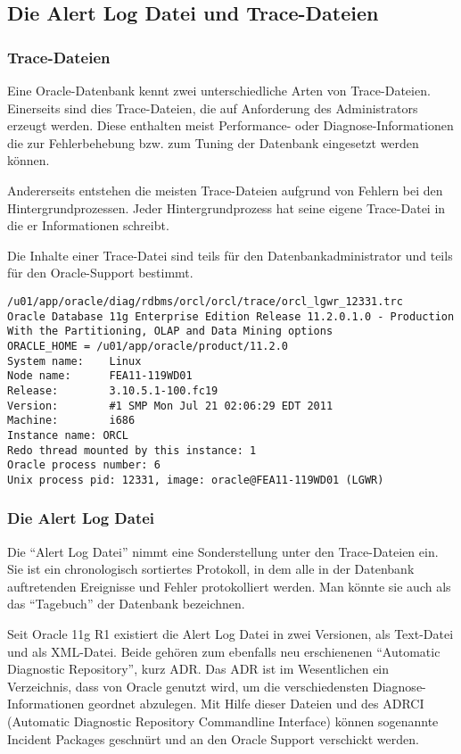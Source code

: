         \subsection{Die Alert Log Datei und Trace-Dateien}
          \subsubsection{Trace-Dateien}
            Eine Oracle-Datenbank kennt zwei unterschiedliche Arten von Trace-Dateien. Einerseits sind dies Trace-Dateien, die auf Anforderung des Administrators erzeugt werden. Diese enthalten meist Performance- oder Diagnose-Informationen die zur Fehlerbehebung bzw. zum Tuning der Datenbank eingesetzt werden k\"onnen.

            Andererseits entstehen die meisten Trace-Dateien aufgrund von Fehlern bei den Hintergrundprozessen. Jeder Hintergrundprozess hat seine eigene Trace-Datei in die er Informationen schreibt.

						Die Inhalte einer Trace-Datei sind teils f\"ur den Datenbankadministrator und teils f\"ur den Oracle-Support bestimmt.
\clearpage
            \begin{lstlisting}[caption={Eine Tracedatei des Log Writers},
            label=orcl_lgwr_12331,emph={[9]ORACLE_HOME},emphstyle={[9]\color{black}},language=terminal]
/u01/app/oracle/diag/rdbms/orcl/orcl/trace/orcl_lgwr_12331.trc 
Oracle Database 11g Enterprise Edition Release 11.2.0.1.0 - Production
With the Partitioning, OLAP and Data Mining options
ORACLE_HOME = /u01/app/oracle/product/11.2.0
System name:    Linux
Node name:      FEA11-119WD01
Release:        3.10.5.1-100.fc19
Version:        #1 SMP Mon Jul 21 02:06:29 EDT 2011
Machine:        i686
Instance name: ORCL
Redo thread mounted by this instance: 1
Oracle process number: 6
Unix process pid: 12331, image: oracle@FEA11-119WD01 (LGWR)
            \end{lstlisting}
					\subsubsection{Die Alert Log Datei}
						Die \enquote{Alert Log Datei} nimmt eine Sonderstellung unter den Trace-Dateien ein. Sie ist ein chronologisch sortiertes Protokoll, in dem alle in der Datenbank auftretenden Ereignisse und Fehler protokolliert werden. Man k\"onnte sie auch als das \enquote{Tagebuch} der Datenbank bezeichnen.

						Seit Oracle 11g R1 existiert die Alert Log Datei in zwei Versionen, als Text-Datei und als XML-Datei. Beide geh\"oren zum ebenfalls neu erschienenen \enquote{Automatic Diagnostic Repository}, kurz ADR. Das ADR ist im Wesentlichen ein Verzeichnis, dass von Oracle genutzt wird, um die verschiedensten Diagnose-Informationen geordnet abzulegen. Mit Hilfe dieser Dateien und des ADRCI (Automatic Diagnostic Repository Commandline Interface) k\"onnen sogenannte Incident Packages geschn\"urt und an den Oracle Support verschickt werden.

